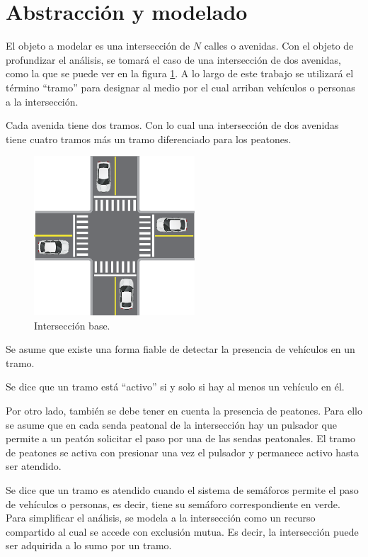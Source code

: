 \lstset {
	tabsize=2,
	basicstyle=\footnotesize\ttfamily,breaklines=true
}

\section{Abstracción y modelado}

	El objeto a modelar es una intersección de $N$ calles o avenidas.
	Con el objeto de profundizar el análisis, se tomará el caso de una intersección de dos avenidas, como la que se puede ver en la figura \ref{fig:interseccion-base}.
	A lo largo de este trabajo se utilizará el término \enquote{tramo} para designar al medio por el cual arriban vehículos o personas a la intersección.
	
	Cada avenida tiene dos tramos.
	Con lo cual una intersección de dos avenidas tiene cuatro tramos más un tramo diferenciado para los peatones. 
	\begin{figure}[htbp]
		\centering
		\includegraphics[width=6cm]{imagenes/interseccion-base.eps}
		\caption{Intersección base.}
		\label{fig:interseccion-base}
	\end{figure}

	Se asume que existe una forma fiable de detectar la presencia de vehículos en un tramo.

	Se dice que un tramo está \enquote{activo} si y solo si hay al menos un vehículo en él.

	Por otro lado, también se debe tener en cuenta la presencia de peatones.
	Para ello se asume que en cada senda peatonal de la intersección hay un pulsador que permite a un peatón solicitar el paso por una de las sendas peatonales.
	El tramo de peatones se activa con presionar una vez el pulsador y permanece activo hasta ser atendido.

	Se dice que un tramo es atendido cuando el sistema de semáforos permite el paso de vehículos o personas, es decir, tiene su semáforo correspondiente en verde.
	Para simplificar el análisis, se modela a la intersección como un recurso compartido al cual se accede con exclusión mutua.
	Es decir, la intersección puede ser adquirida a lo sumo por un tramo.



